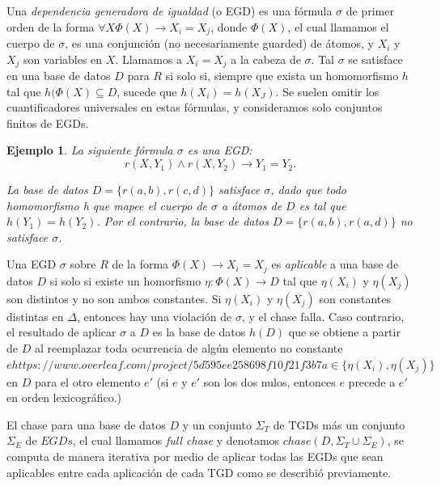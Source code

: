 \documentclass[11pt,a4paper,twoside]{tesis}
\newtheorem{exmp}{Ejemplo}
\begin{document}
Una \textit{dependencia generadora de igualdad} (o EGD) es una fórmula $\sigma$ de primer orden de la forma $\forall X \Phi(X) \rightarrow X_i = X_j$, donde $\Phi(X)$, el cual llamamos el cuerpo de $\sigma$, es una conjunción (no necesariamente guarded) de átomos, y $X_i$ y $X_j$ son variables en $X$. Llamamos a $X_i = X_j$ a la cabeza de $\sigma$. Tal $\sigma$ se satisface en una base de datos $D$ para $R$ si solo si, siempre que exista un homomorfismo $h$ tal que $h(\Phi(X) \subseteq D$, sucede que $h(X_i) = h(X_J)$. Se suelen omitir los cuantificadores universales en estas fórmulas, y consideramos solo conjuntos finitos de EGDs.

\begin{exmp}
La siguiente fórmula $\sigma$ es una EGD: $$r(X, Y_1) \land r(X,Y_2) \rightarrow Y_1 = Y_2.$$

La base de datos $D = \{r(a, b), r(c, d)\}$ satisface $\sigma$, dado que todo homomorfismo h que mapee el cuerpo de $\sigma$ a átomos de $D$ es tal que $h(Y_1) = h(Y_2)$. Por el contrario, la base de datos $D = \{r(a, b), r(a, d)\}$ no satisface $\sigma$.

\end{exmp}

Una EGD $\sigma$ sobre $R$ de la forma $\Phi(X) \rightarrow X_i = X_j$ es \textit{aplicable} a una base de datos $D$ si solo si existe un homorfismo $\eta : \Phi(X) \rightarrow D$ tal que $\eta(X_i)$ y $\eta(X_j)$ son distintos y no son ambos constantes. Si $\eta(X_i)$ y $\eta(X_j)$ son constantes distintas en $\Delta$, entonces hay una violación de $\sigma$, y el chase falla. Caso contrario, el resultado de aplicar $\sigma$ a $D$ es la base de datos $h(D)$ que se obtiene a partir de $D$ al reemplazar toda ocurrencia de algún elemento no constante $e https://www.overleaf.com/project/5d595ee258698f10f21f3b7a\in \{\eta(X_i), \eta(X_j)\}$ en $D$ para el otro elemento $e\prime$ (si $e$ y $e\prime$ son los dos nulos, entonces $e$ precede a $e\prime$ en orden lexicográfico.)

El chase para una base de datos $D$ y un conjunto $\Sigma_T$ de TGDs más un conjunto $\Sigma_E$ de $EGDs$, el cual llamamos \textit{full chase} y denotamos $chase(D, \Sigma_T \cup \Sigma_E)$, se computa de manera iterativa por medio de aplicar todas las EGDs que sean aplicables entre cada aplicación de cada TGD como se describió previamente.
\end{document}
